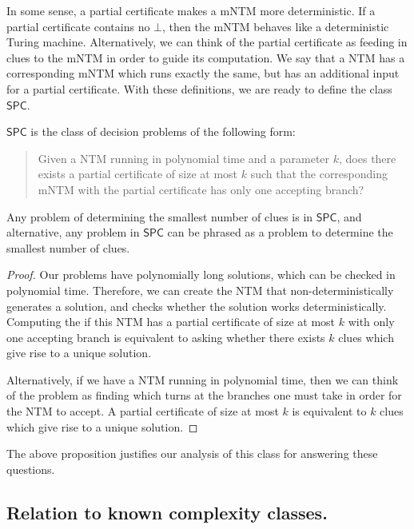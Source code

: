 \documentclass[runningheads,a4paper]{llncs}
\begin{document}
In some sense, a partial certificate makes a mNTM more deterministic. If a partial certificate contains no $\bot$, then the mNTM behaves like a deterministic Turing machine. Alternatively, we can think of the partial certificate as feeding in clues to the mNTM in order to guide its computation. We say that a NTM has a corresponding mNTM which runs exactly the same, but has an additional input for a partial certificate. With these definitions, we are ready to define the class $\mathsf{SPC}$.

\begin{definition}
$\mathsf{SPC}$ is the class of decision problems of the following form:\\
\begin{quote}
Given a NTM running in polynomial time and a parameter $k$, does there exists a partial certificate of size at most $k$ such that the corresponding mNTM with the partial certificate has only one accepting branch?
\end{quote}
\end{definition}

\begin{proposition}
Any problem of determining the smallest number of clues is in $\mathsf{SPC}$, and alternative, any problem in $\mathsf{SPC}$ can be phrased as a problem to determine the smallest number of clues.
\end{proposition}

\begin{proof}
Our problems have polynomially long solutions, which can be checked in polynomial time. Therefore, we can create the NTM that non-deterministically generates a solution, and checks whether the solution works deterministically. Computing the if this NTM has a partial certificate of size at most $k$ with only one accepting branch is equivalent to asking whether there exists $k$ clues which give rise to a unique solution. 

Alternatively, if we have a NTM running in polynomial time, then we can think of the problem as finding which turns at the branches one must take in order for the NTM to accept. A partial certificate of size at most $k$ is equivalent to $k$ clues which give rise to a unique solution.
\end{proof}

The above proposition justifies our analysis of this class for answering these questions.

\subsection{Relation to known complexity classes.}
\end{document}
